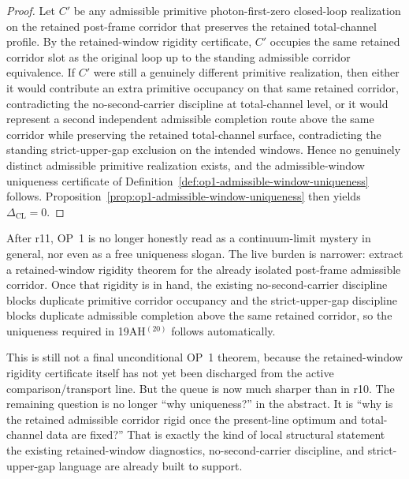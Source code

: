 \begin{proof}
Let \(C'\) be any admissible primitive photon-first-zero closed-loop realization on the retained post-frame corridor that preserves the retained total-channel profile. By the retained-window rigidity certificate, \(C'\) occupies the same retained corridor slot as the original loop up to the standing admissible corridor equivalence. If \(C'\) were still a genuinely different primitive realization, then either it would contribute an extra primitive occupancy on that same retained corridor, contradicting the no-second-carrier discipline at total-channel level, or it would represent a second independent admissible completion route above the same corridor while preserving the retained total-channel surface, contradicting the standing strict-upper-gap exclusion on the intended windows. Hence no genuinely distinct admissible primitive realization exists, and the admissible-window uniqueness certificate of Definition~\ref{def:op1-admissible-window-uniqueness} follows. Proposition~\ref{prop:op1-admissible-window-uniqueness} then yields \(\Delta_{\mathrm{CL}}=0\).
\end{proof}

\begin{corollary}
\label{cor:op1-live-burden-after-r11}
After r11, OP~1 is no longer honestly read as a continuum-limit mystery in general, nor even as a free uniqueness slogan. The live burden is narrower: extract a retained-window rigidity theorem for the already isolated post-frame admissible corridor. Once that rigidity is in hand, the existing no-second-carrier discipline blocks duplicate primitive corridor occupancy and the strict-upper-gap discipline blocks duplicate admissible completion above the same retained corridor, so the uniqueness required in 19AH$^{(20)}$ follows automatically.
\end{corollary}

\begin{remark}
This is still not a final unconditional OP~1 theorem, because the retained-window rigidity certificate itself has not yet been discharged from the active comparison/transport line. But the queue is now much sharper than in r10. The remaining question is no longer ``why uniqueness?'' in the abstract. It is ``why is the retained admissible corridor rigid once the present-line optimum and total-channel data are fixed?'' That is exactly the kind of local structural statement the existing retained-window diagnostics, no-second-carrier discipline, and strict-upper-gap language are already built to support.
\end{remark}


